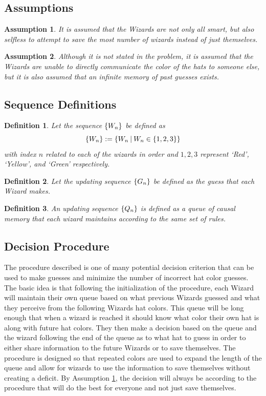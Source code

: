 \documentclass[]{article}
\newcommand{\st}{ \ \vline \ }
\newtheorem{definition}{Definition}
\newtheorem{assumption}{Assumption}
\begin{document}
\subsection*{Assumptions}
\begin{assumption}\label{asmp:selfless}
    It is assumed that the Wizards are not only all smart, but also selfless to attempt to 
    save the most number of wizards instead of just themselves.
\end{assumption}
\begin{assumption}
    Although it is not stated in the problem, it is assumed that the Wizards 
    are unable to directly communicate the color of the hats to someone else, 
    but it is also assumed that an infinite memory of past guesses exists.
\end{assumption}

\subsection*{Sequence Definitions}
\begin{definition}
    Let the sequence $\qty{W_n}$ be defined as
    $$\qty{W_n} := \qty{W_n \st W_n \in \{1,2,3\}}$$
    with index $n$ related to each of the wizards in order and 
    $1,2,3$ represent `Red', `Yellow', and `Green' respectively.
\end{definition}
\begin{definition}
    Let the updating sequence $\qty{G_n}$ be defined as the guess that each Wizard makes.
\end{definition}
\begin{definition}
    An updating sequence $\qty{Q_n}$ is defined as a queue of causal memory that each wizard 
    maintains according to the same set of rules.
\end{definition}
\subsection*{Decision Procedure}
The procedure described is one of many potential decision criterion that can be used to 
make guesses and minimize the number of incorrect hat color guesses. The basic idea 
is that following the initialization of the procedure, each Wizard will maintain their own 
queue based on what previous Wizards guessed and what they perceive from the following 
Wizards hat colors. This queue will be long enough that when a wizard is reached it should 
know what color their own hat is along with future hat colors. They then make a decision based 
on the queue and the wizard following the end of the queue as to what hat to guess in order 
to either share information to the future Wizards or to save themselves. The procedure is 
designed so that repeated colors are used to expand the length of the queue and allow 
for wizards to use the information to save themselves without creating a deficit.
By Assumption \ref{asmp:selfless}, the decision will always be according to the procedure 
that will do the best for everyone and not just save themselves.
\end{document}
